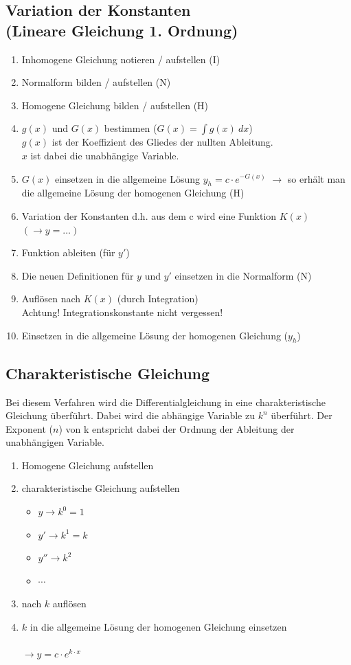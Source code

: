 \subsection{Variation der Konstanten \\(Lineare Gleichung 1. Ordnung)}
\begin{enumerate}
  \item Inhomogene Gleichung notieren / aufstellen (I)
  \item Normalform bilden / aufstellen (N)
  \item Homogene Gleichung bilden / aufstellen (H)
  \item $g(x)$ und $G(x)$ bestimmen ($G(x) = \int g(x) ~ dx$) \\
        $g(x)$ ist der Koeffizient des Gliedes der nullten Ableitung. \\
        $x$ ist dabei die unabhängige Variable. 
  \item $G(x)$ einsetzen in die allgemeine Lösung $y_h=c \cdot e^{-G(x)}$
        $\rightarrow$ so erhält man die allgemeine Lösung der 
        homogenen Gleichung (H)
  \item Variation der Konstanten d.h. aus dem c wird eine Funktion $K(x)$ 
        $(\rightarrow y= \ldots)$
  \item Funktion ableiten (für $y'$)
  \item Die neuen Definitionen für $y$ und $y'$ einsetzen in die Normalform (N) 
  \item Auflösen nach $K(x)$ (durch Integration) \\
        Achtung! Integrationskonstante nicht vergessen! 
  \item Einsetzen in die allgemeine Lösung der homogenen Gleichung ($y_h$)
\end{enumerate}

\subsection{Charakteristische Gleichung}
Bei diesem Verfahren wird die Differentialgleichung in eine charakteristische 
Gleichung überführt. Dabei wird die abhängige Variable zu $k^{n}$ überführt. 
Der Exponent ($n$) von k entspricht dabei der Ordnung der Ableitung der 
unabhängigen Variable. 
\begin{enumerate}
  \item Homogene Gleichung aufstellen
  \item charakteristische Gleichung aufstellen
    \begin{itemize}
      \item $y \rightarrow k^0 = 1$
      \item $y' \rightarrow k^1 = k$
      \item $y'' \rightarrow k^2$
      \item $\cdots$
    \end{itemize}
  \item nach $k$ auflösen
  \item $k$ in die allgemeine Lösung der homogenen Gleichung einsetzen\\\\
        $\rightarrow y = c \cdot e^{k \cdot x}$
\end{enumerate}


